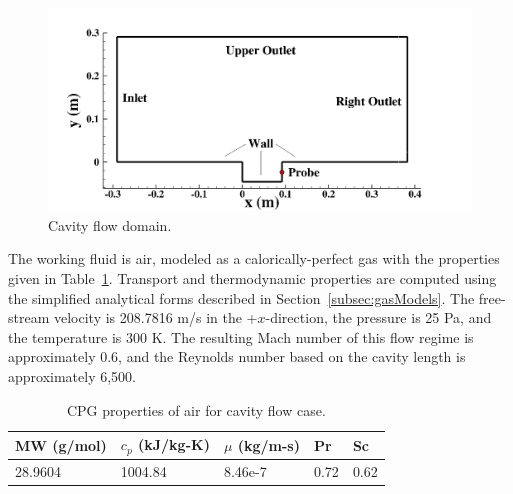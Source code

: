 \begin{figure}
    \centering
	\includegraphics[width=0.9\linewidth]{Chapters/HPROMResults/Images/cavity/geom.png}
    \caption{\label{fig:cavityGeom}Cavity flow domain.}
\end{figure}

The working fluid is air, modeled as a calorically-perfect gas with the properties given in Table~\ref{tab:airProps}. Transport and thermodynamic properties are computed using the simplified analytical forms described in Section~\ref{subsec:gasModels}. The free-stream velocity is 208.7816 m/s in the +$x$-direction, the pressure is 25 Pa, and the temperature is 300 K. The resulting Mach number of this flow regime is approximately 0.6, and the Reynolds number based on the cavity length is approximately 6,500.

\begin{table}
	\centering
	\begin{tabular}{ lllll }
	\toprule
	MW (g/mol) & $c_p$ (kJ/kg-K) & $\mu$ (kg/m-s) & Pr & Sc   \\
	\midrule
	28.9604 & 1004.84 & 8.46e-7 & 0.72 & 0.62 \\
	\bottomrule
	\end{tabular}
	\caption{\label{tab:airProps}CPG properties of air for cavity flow case.}
\end{table}

